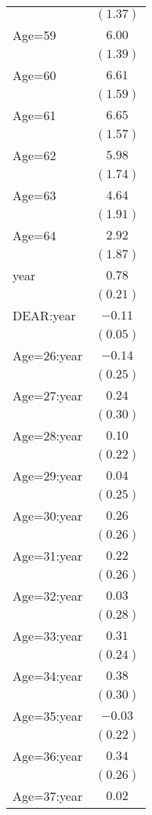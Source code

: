 \documentclass[fullpage]{paper}
\begin{document}
\begin{center}
\begin{longtable}{l c }
            & $(1.37)$ \\
Age=59      & $6.00$   \\
            & $(1.39)$ \\
Age=60      & $6.61$   \\
            & $(1.59)$ \\
Age=61      & $6.65$   \\
            & $(1.57)$ \\
Age=62      & $5.98$   \\
            & $(1.74)$ \\
Age=63      & $4.64$   \\
            & $(1.91)$ \\
Age=64      & $2.92$   \\
            & $(1.87)$ \\
year        & $0.78$   \\
            & $(0.21)$ \\
DEAR:year   & $-0.11$  \\
            & $(0.05)$ \\
Age=26:year & $-0.14$  \\
            & $(0.25)$ \\
Age=27:year & $0.24$   \\
            & $(0.30)$ \\
Age=28:year & $0.10$   \\
            & $(0.22)$ \\
Age=29:year & $0.04$   \\
            & $(0.25)$ \\
Age=30:year & $0.26$   \\
            & $(0.26)$ \\
Age=31:year & $0.22$   \\
            & $(0.26)$ \\
Age=32:year & $0.03$   \\
            & $(0.28)$ \\
Age=33:year & $0.31$   \\
            & $(0.24)$ \\
Age=34:year & $0.38$   \\
            & $(0.30)$ \\
Age=35:year & $-0.03$  \\
            & $(0.22)$ \\
Age=36:year & $0.34$   \\
            & $(0.26)$ \\
Age=37:year & $0.02$   \\

\end{longtable}
\end{center}
\end{document}
